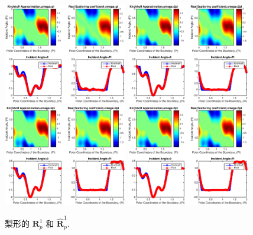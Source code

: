 {\begin{figure}[htbp]
	\centering
	\includegraphics[width=0.48\textwidth]{./Img/figure_sc_elastic/sc_p1_pear_1.eps}
	\includegraphics[width=0.48\textwidth]{./Img/figure_sc_elastic/sc_p1_pear_2.eps}
	\includegraphics[width=0.48\textwidth]{./Img/figure_sc_elastic/sc_p1_pear_4.eps}
	\includegraphics[width=0.48\textwidth]{./Img/figure_sc_elastic/sc_p1_pear_8.eps}		
	\caption{梨形的 $\mathbf{R}_p^1$ 和 $\hat {\mathbf{R}}_p^1$. }\label{figure_6}
\end{figure}



}
